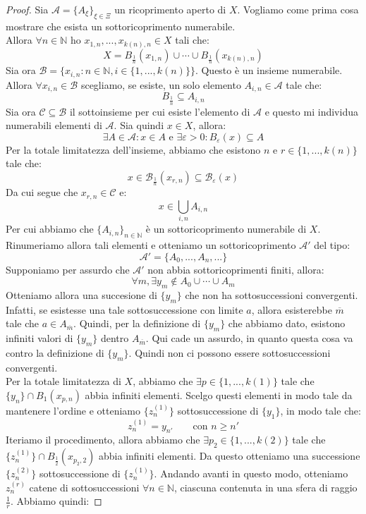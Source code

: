 \documentclass[11pt,a4paper,twoside]{article}
\newcommand{\vareps}{\varepsilon}
\theoremstyle{definition}
\begin{document}
\begin{proof}
	 Sia $\mathcal A = \{A_\xi\}_{\xi \in \Xi}$ un ricoprimento aperto di $X$. Vogliamo come prima cosa mostrare che esista un sottoricoprimento numerabile.\\
	Allora $\forall n\in \mathbb N$ ho $x_{1,n},...,x_{k(n),n} \in X$ tali che:
	\[ X = B_{\frac 1n} (x_{1,n}) \cup \cdots \cup B_{\frac 1n}(x_{k(n),n}) \]
	Sia ora $\mathcal B = \{ x_{i,n} : n \in \mathbb N, i \in \{1,...,k(n)\} \}$. Questo è un insieme numerabile. Allora $\forall x_{i,n} \in \mathcal B$ scegliamo, se esiste, un solo elemento $A_{i,n} \in \mathcal A$ tale che:
	\[ B_{\frac 1n} \subseteq A_{i,n} \]
	Sia ora $\mathcal C \subseteq \mathcal B$ il sottoinsieme per cui esiste l'elemento di $\mathcal A$ e questo mi individua numerabili elementi di $\mathcal A$. Sia quindi $x \in X$, allora:
	\[\exists A \in \mathcal A:x \in A \text{ e }\exists \vareps>0 : B_\vareps(x)\subseteq A \]
	Per la totale limitatezza dell'insieme, abbiamo che esistono $n$ e $r \in \{1,...,k(n)\}$ tale che:
	\[x \in \mathcal B_{\frac 1n}(x_{r,n}) \subseteq \mathcal B_\vareps(x)\]
	Da cui segue che $x_{r,n} \in \mathcal C$ e:
	\[ x \in \bigcup_{i,n}A_{i,n} \]
	Per cui abbiamo che $\{A_{i,n}\}_{n\in \mathbb N}$ è un sottoricoprimento numerabile di $X$. Rinumeriamo allora tali elementi e otteniamo un sottoricoprimento $\mathcal A'$ del tipo:
	\[ \mathcal A' = \{A_0,...,A_n,...\} \]
	Supponiamo per assurdo che $\mathcal A'$ non abbia sottoricoprimenti finiti, allora:
	\[ \forall m,\exists y_m \not \in A_0 \cup \cdots \cup A_m \]
	Otteniamo allora una succesione di $\{y_m\}$ che non ha sottosuccessioni convergenti. Infatti, se esistesse una tale sottosuccessione con limite $a$, allora esisterebbe $\overline m$ tale che $a \in A_{\overline m}$.
	Quindi, per la definizione di $\{y_m\}$ che abbiamo dato, esistono infiniti valori di $\{y_m\}$ dentro $A_{\overline m}$. Qui cade un assurdo, in quanto questa cosa va contro la definizione di $\{y_m\}$. Quindi non ci possono essere sottosuccessioni convergenti.\\
	Per la totale limitatezza di $X$, abbiamo che $\exists p \in \{1,...,k(1)\}$ tale che $\{y_n\} \cap B_1(x_{p,n})$ abbia infiniti elementi. Scelgo questi elementi in modo tale da mantenere l'ordine e otteniamo $\{z^{(1)}_n\}$ sottosuccessione di $\{y_1\}$, in modo tale che:
	\[ z^{(1)}_{n} = y_{n'} \qquad \text{con }n\geq n'\]
	Iteriamo il procedimento, allora abbiamo che $\exists p_2 \in \{1,...,k(2)\}$ tale che $\{z_n^{(1)}\} \cap B_{\frac 12} (x_{p_2,2})$ abbia infiniti elementi. Da questo otteniamo una successione $\{ z^{(2)}_n \}$ sottosuccessione di $\{ z_n^{(1)} \}$. Andando avanti in questo modo, otteniamo $z^{(r)}_n$ catene di sottosuccessioni $\forall n \in \mathbb N$, ciascuna contenuta in una sfera di raggio $\frac 1r$. Abbiamo quindi:

\end{proof}
\end{document}
